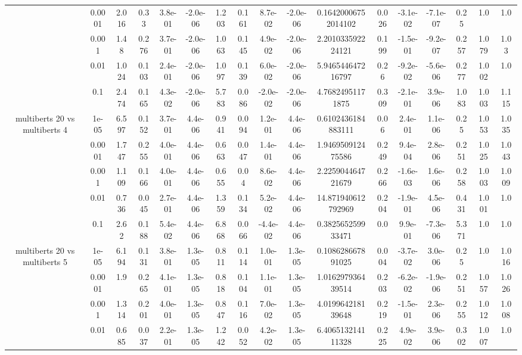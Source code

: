 \begin{tabular}{|c|c|c|c|c|c|c|c|c|c|c|c|c|c|c|c|c|}
 & 0.0001 & 2.016 & 0.33 & 3.8e-01 & -2.0e-06 & 1.203 & 0.161 & 8.7e-02 & -2.0e-06 & 0.16420006752014102 & 0.026 & -3.1e-02 & -7.1e-07 & 0.25 & 1.0 & 1.0 \\
 & 0.001 & 1.48 & 0.276 & 3.7e-01 & -2.0e-06 & 1.063 & 0.145 & 4.9e-02 & -2.0e-06 & 2.201033592224121 & 0.199 & -1.5e-01 & -9.2e-07 & 0.257 & 1.079 & 1.03 \\
 & 0.01 & 1.024 & 0.103 & 2.4e-01 & -2.0e-06 & 1.097 & 0.139 & 6.0e-02 & -2.0e-06 & 5.946544647216797 & 0.26 & -9.2e-02 & -5.6e-06 & 0.277 & 1.002 & 1.0 \\
 & 0.1 & 2.474 & 0.165 & 4.3e-02 & -2.0e-06 & 5.783 & 0.086 & -2.0e-02 & -2.0e-06 & 4.76824951171875 & 0.309 & -2.1e-01 & 3.9e-06 & 1.083 & 1.003 & 1.115 \\
\hline
\multirow{5}{*}{multiberts 20 vs multiberts 4} & 1e-05 & 6.597 & 0.152 & 3.7e-01 & 4.4e-06 & 0.941 & 0.094 & 1.2e-01 & 4.4e-06 & 0.6102436184883111 & 0.06 & 2.4e-01 & 1.1e-06 & 0.25 & 1.053 & 1.035 \\
 & 0.0001 & 1.747 & 0.255 & 4.0e-01 & 4.4e-06 & 0.663 & 0.047 & 1.4e-01 & 4.4e-06 & 1.946950912475586 & 0.249 & 9.4e-04 & 2.8e-06 & 0.251 & 1.025 & 1.043 \\
 & 0.001 & 1.109 & 0.166 & 4.0e-01 & 4.4e-06 & 0.655 & 0.04 & 8.6e-02 & 4.4e-06 & 2.225904464721679 & 0.266 & -1.6e-03 & 1.6e-06 & 0.258 & 1.003 & 1.009 \\
 & 0.01 & 0.736 & 0.045 & 2.7e-01 & 4.4e-06 & 1.359 & 0.134 & 5.2e-02 & 4.4e-06 & 14.871940612792969 & 0.204 & -1.9e-01 & 4.5e-06 & 0.431 & 1.001 & 1.0 \\
 & 0.1 & 2.62 & 0.188 & 5.4e-02 & 4.4e-06 & 6.868 & 0.066 & -4.4e-02 & 4.4e-06 & 0.382565259933471 & 0.0 & 9.9e-01 & -7.3e-06 & 5.371 & 1.0 & 1.0 \\
\hline
\multirow{5}{*}{multiberts 20 vs multiberts 5} & 1e-05 & 6.194 & 0.131 & 3.8e-01 & 1.3e-05 & 0.811 & 0.114 & 1.0e-01 & 1.3e-05 & 0.108628667891025 & 0.004 & -3.7e-02 & 3.0e-06 & 0.25 & 1.0 & 1.016 \\
 & 0.0001 & 1.9 & 0.265 & 4.1e-01 & 1.3e-05 & 0.818 & 0.104 & 1.1e-01 & 1.3e-05 & 1.016297936439514 & 0.203 & -6.2e-02 & -1.9e-06 & 0.251 & 1.057 & 1.026 \\
 & 0.001 & 1.314 & 0.201 & 4.0e-01 & 1.3e-05 & 0.847 & 0.116 & 7.0e-02 & 1.3e-05 & 4.019964218139648 & 0.219 & -1.5e-01 & 2.3e-06 & 0.255 & 1.012 & 1.008 \\
 & 0.01 & 0.685 & 0.037 & 2.2e-01 & 1.3e-05 & 1.242 & 0.052 & 4.2e-02 & 1.3e-05 & 6.406513214111328 & 0.225 & 4.9e-02 & 3.9e-06 & 0.302 & 1.007 & 1.0 \\

\end{tabular}
